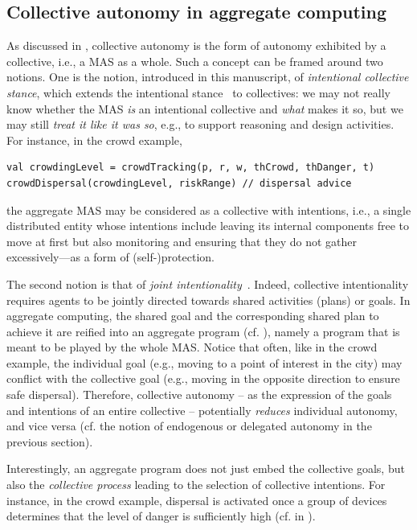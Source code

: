 \subsection{Collective autonomy in aggregate computing}
\label{mdpi2020:contrib-collective-autonomy}

As discussed in , collective autonomy is the form of autonomy exhibited by a collective,
 i.e., a MAS as a whole.
%
Such a concept can be framed around two notions.
%
One is the notion, introduced in this manuscript, of \emph{intentional collective stance},
 which extends the intentional stance~\cite{dennett1989intentional} to collectives:
 we may not really know whether the MAS \emph{is} an intentional collective
 and \emph{what} makes it so,
  but we may still \emph{treat it like it was so}, e.g., to support reasoning and design activities.
%
For instance, in the crowd example,
%
\begin{lstlisting}
val crowdingLevel = crowdTracking(p, r, w, thCrowd, thDanger, t)
crowdDispersal(crowdingLevel, riskRange) // dispersal advice
\end{lstlisting}
%
the aggregate MAS may be considered as a collective
 with intentions, i.e., 
 a single distributed entity
 whose intentions include leaving its internal components free
 to move at first
 but also 
 monitoring and ensuring that they do not gather excessively---as a form of (self-)protection.

The second notion is that of \emph{joint intentionality}~\cite{DBLP:journals/mima/Huebner15}.
%
Indeed, collective intentionality 
 requires agents to be jointly directed towards 
 shared activities (plans) or goals.
%
In aggregate computing, the shared goal 
 and the corresponding shared plan to achieve it
 are reified into an aggregate program (cf. ),
 namely a program that is  
 meant to be played by the whole MAS.
%
Notice that often, like in the crowd example,
 the individual goal (e.g., moving to a point of interest in the city)
 may conflict with the collective goal
 (e.g., moving in the opposite direction to ensure safe dispersal).
%
Therefore, collective autonomy -- as the expression of the goals and intentions of an entire collective -- potentially \emph{reduces} individual autonomy, and vice versa (cf. the notion of endogenous or delegated autonomy in the previous section).

Interestingly, an aggregate program does not just embed
 the collective goals,
 but also the \emph{collective process}
 leading to the selection of collective intentions.
%
For instance, in the crowd example,
 dispersal is activated 
 once a group of devices
 determines that the level of danger is sufficiently high
 (cf.  in ).
 
